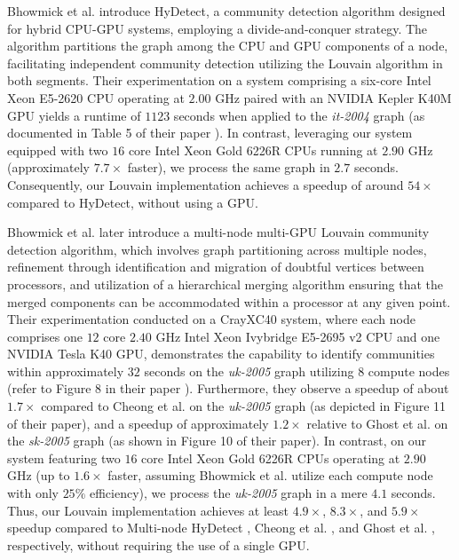 Bhowmick et al. \cite{com-bhowmik19} introduce HyDetect, a community detection algorithm designed for hybrid CPU-GPU systems, employing a divide-and-conquer strategy. The algorithm partitions the graph among the CPU and GPU components of a node, facilitating independent community detection utilizing the Louvain algorithm in both segments. Their experimentation on a system comprising a six-core Intel Xeon E5-2620 CPU operating at $2.00$ GHz paired with an NVIDIA Kepler K40M GPU yields a runtime of $1123$ seconds when applied to the \textit{it-2004} graph (as documented in Table 5 of their paper \cite{com-bhowmik19}). In contrast, leveraging our system equipped with two $16$ core Intel Xeon Gold 6226R CPUs running at $2.90$ GHz (approximately $7.7\times$ faster), we process the same graph in $2.7$ seconds. Consequently, our Louvain implementation achieves a speedup of around $54\times$ compared to HyDetect, without using a GPU.

Bhowmick et al. \cite{com-bhowmick22} later introduce a multi-node multi-GPU Louvain community detection algorithm, which involves graph partitioning across multiple nodes, refinement through identification and migration of doubtful vertices between processors, and utilization of a hierarchical merging algorithm ensuring that the merged components can be accommodated within a processor at any given point. Their experimentation conducted on a CrayXC40 system, where each node comprises one $12$ core $2.40$ GHz Intel Xeon Ivybridge E5-2695 v2 CPU and one NVIDIA Tesla K40 GPU, demonstrates the capability to identify communities within approximately $32$ seconds on the \textit{uk-2005} graph utilizing $8$ compute nodes (refer to Figure 8 in their paper \cite{com-bhowmick22}). Furthermore, they observe a speedup of about $1.7\times$ compared to Cheong et al. \cite{com-cheong13} on the \textit{uk-2005} graph (as depicted in Figure 11 of their paper), and a speedup of approximately $1.2\times$ relative to Ghost et al. \cite{com-ghosh18} on the \textit{sk-2005} graph (as shown in Figure 10 of their paper). In contrast, on our system featuring two $16$ core Intel Xeon Gold 6226R CPUs operating at $2.90$ GHz (up to $1.6\times$ faster, assuming Bhowmick et al. utilize each compute node with only $25\%$ efficiency), we process the \textit{uk-2005} graph in a mere $4.1$ seconds. Thus, our Louvain implementation achieves at least $4.9\times$, $8.3\times$, and $5.9\times$ speedup compared to Multi-node HyDetect \cite{com-bhowmick22}, Cheong et al. \cite{com-cheong13}, and Ghost et al. \cite{com-ghosh18}, respectively, without requiring the use of a single GPU.

